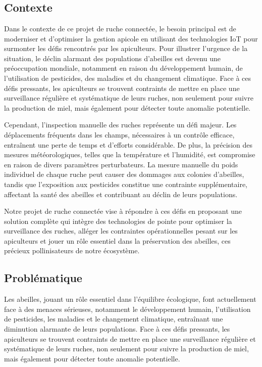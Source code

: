 \documentclass[a4paper,12pt]{report}
\begin{document}
	\pagestyle{empty}
	\chapter{ }
	\section*{Contexte }
Dans le contexte de ce projet de ruche connectée, le besoin principal est de moderniser et d'optimiser la gestion apicole en utilisant des technologies IoT pour surmonter les défis rencontrés par les apiculteurs. Pour illustrer l'urgence de la situation, le déclin alarmant des populations d'abeilles est devenu une préoccupation mondiale, notamment en raison du développement humain, de l'utilisation de pesticides, des maladies et du changement climatique. Face à ces défis pressants, les apiculteurs se trouvent contraints de mettre en place une surveillance régulière et systématique de leurs ruches, non seulement pour suivre la production de miel, mais également pour détecter toute anomalie potentielle.

Cependant, l'inspection manuelle des ruches représente un défi majeur. Les déplacements fréquents dans les champs, nécessaires à un contrôle efficace, entraînent une perte de temps et d'efforts considérable. De plus, la précision des mesures météorologiques, telles que la température et l'humidité, est compromise en raison de divers paramètres perturbateurs. La mesure manuelle du poids individuel de chaque ruche peut causer des dommages aux colonies d'abeilles, tandis que l'exposition aux pesticides constitue une contrainte supplémentaire, affectant la santé des abeilles et contribuant au déclin de leurs populations.

Notre projet de ruche connectée vise à répondre à ces défis en proposant une solution complète qui intègre des technologies de pointe pour optimiser la surveillance des ruches, alléger les contraintes opérationnelles pesant sur les apiculteurs et jouer un rôle essentiel dans la préservation des abeilles, ces précieux pollinisateurs de notre écosystème.
	\section*{Problématique}
	Les abeilles, jouant un rôle essentiel dans l'équilibre écologique, font actuellement face à des menaces sérieuses, notamment le développement humain, l'utilisation de pesticides, les maladies et le changement climatique, entraînant une diminution alarmante de leurs populations. Face à ces défis pressants, les apiculteurs se trouvent contraints de mettre en place une surveillance régulière et systématique de leurs ruches, non seulement pour suivre la production de miel, mais également pour détecter toute anomalie potentielle.
	
\end{document}
